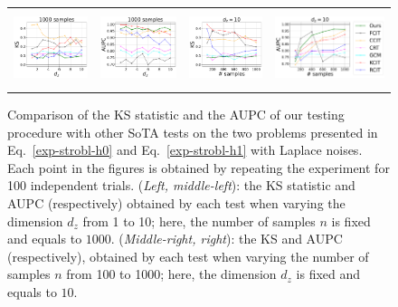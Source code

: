 \begin{figure}[htb]
\begin{tabular}{cccc} 
\includegraphics[height=2.2cm]{sections/appendix/independence_testing_kernel/new_figures_lap/nsamples_fixed_1000_strobl_dim_1_10_ks.pdf}& \includegraphics[height=2.2cm]{sections/appendix/independence_testing_kernel/new_figures_lap/nsamples_fixed_1000_strobl_dim_1_10_aupc.pdf} & 
\includegraphics[height=2.2cm]{sections/appendix/independence_testing_kernel/new_figures_lap/dim_fixed_10_strobl_ks.pdf}& \includegraphics[height=2.2cm]{sections/appendix/independence_testing_kernel/new_figures_lap/dim_fixed_10_strobl_aupc.pdf} 
\end{tabular}
\caption{Comparison of the KS statistic and the AUPC of our testing procedure with other SoTA tests on the two problems presented in Eq.~\eqref{exp-strobl-h0} and Eq.~\eqref{exp-strobl-h1}  with Laplace noises. Each point in the figures is obtained by repeating the experiment for 100 independent trials. (\emph{Left, middle-left}): the KS statistic and AUPC (respectively) obtained by each test when varying the dimension $d_z$ from 1 to 10; here, the number of samples $n$ is fixed and equals to $1000$. (\emph{Middle-right, right}): the KS and AUPC (respectively), obtained by each test when varying the number of samples $n$ from 100 to 1000; here, the dimension $d_z$ is fixed and equals to $10$.
\label{fig-exp-strobl-ks-laplace-supp}}
\vspace{-0.5cm}
\end{figure}



